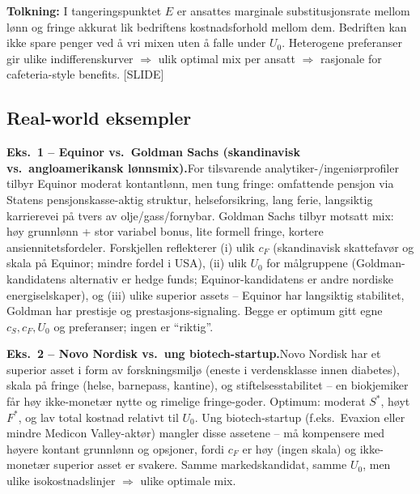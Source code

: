 \textbf{Tolkning:} I tangeringspunktet $E$ er ansattes marginale substitusjonsrate mellom lønn og fringe akkurat lik bedriftens kostnadsforhold mellom dem. Bedriften kan ikke spare penger ved å vri mixen uten å falle under $U_0$. Heterogene preferanser gir ulike indifferenskurver $\Rightarrow$ ulik optimal mix per ansatt $\Rightarrow$ rasjonale for cafeteria-style benefits. [SLIDE]

\subsection*{Real-world eksempler}

\textbf{Eks.~1 -- Equinor vs.\ Goldman Sachs (skandinavisk vs.\ angloamerikansk lønnsmix).}\quad [EKS]
For tilsvarende analytiker-/ingeniørprofiler tilbyr Equinor moderat kontantlønn, men tung fringe: omfattende pensjon via Statens pensjonskasse-aktig struktur, helseforsikring, lang ferie, langsiktig karrierevei på tvers av olje/gass/fornybar. Goldman Sachs tilbyr motsatt mix: høy grunnlønn + stor variabel bonus, lite formell fringe, kortere ansiennitetsfordeler. Forskjellen reflekterer (i) ulik $c_F$ (skandinavisk skattefavør og skala på Equinor; mindre fordel i USA), (ii) ulik $U_0$ for målgruppene (Goldman-kandidatens alternativ er hedge funds; Equinor-kandidatens er andre nordiske energiselskaper), og (iii) ulike superior assets -- Equinor har langsiktig stabilitet, Goldman har prestisje og prestasjons-signaling. Begge er optimum gitt egne $c_S, c_F, U_0$ og preferanser; ingen er ``riktig''.

\textbf{Eks.~2 -- Novo Nordisk vs.\ ung biotech-startup.}\quad [EKS]
Novo Nordisk har et superior asset i form av forskningsmiljø (eneste i verdensklasse innen diabetes), skala på fringe (helse, barnepass, kantine), og stiftelsesstabilitet -- en biokjemiker får høy ikke-monetær nytte og rimelige fringe-goder. Optimum: moderat $S^*$, høyt $F^*$, og lav total kostnad relativt til $U_0$. Ung biotech-startup (f.eks.\ Evaxion eller mindre Medicon Valley-aktør) mangler disse assetene -- må kompensere med høyere kontant grunnlønn og opsjoner, fordi $c_F$ er høy (ingen skala) og ikke-monetær superior asset er svakere. Samme markedskandidat, samme $U_0$, men ulike isokostnadslinjer $\Rightarrow$ ulike optimale mix.

